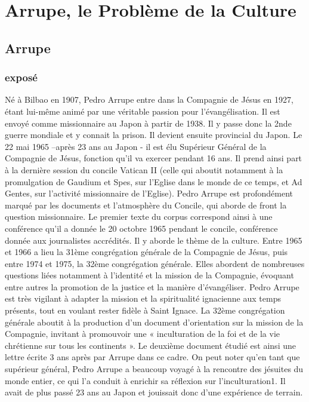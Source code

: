 \chapter{Arrupe, le Problème de la Culture}


\section{Arrupe}

\subsection{exposé}

Né à Bilbao en 1907, Pedro Arrupe entre dans la Compagnie de Jésus en 1927, étant lui-même animé par une véritable passion pour l’évangélisation. Il est envoyé comme missionnaire au Japon à partir de 1938. Il y passe donc la 2nde guerre mondiale et y connait la prison. Il devient ensuite provincial du Japon.
Le 22 mai 1965 –après 23 ans au Japon - il est élu Supérieur Général de la Compagnie de Jésus, fonction qu’il va exercer pendant 16 ans. Il prend ainsi part à la dernière session du concile Vatican II (celle qui aboutit notamment à la promulgation de Gaudium et Spes, sur l’Eglise dans le monde de ce temps, et Ad Gentes, sur l’activité missionnaire de l’Eglise). Pedro Arrupe est profondément marqué par les documents et l’atmosphère du Concile, qui aborde de front la question missionnaire. Le premier texte du corpus correspond ainsi à une conférence qu’il a donnée le 20 octobre 1965 pendant le concile, conférence donnée aux journalistes accrédités. Il y aborde le thème de la culture.
Entre 1965 et 1966 a lieu la 31ème congrégation générale de la Compagnie de Jésus, puis entre 1974 et 1975, la 32ème congrégation générale. Elles abordent de nombreuses questions liées notamment à l’identité et la mission de la Compagnie, évoquant entre autres la promotion de la justice et la manière d’évangéliser. Pedro Arrupe est très vigilant à adapter la mission et la spiritualité ignacienne aux temps présents, tout en voulant rester fidèle à Saint Ignace. La 32ème congrégation générale aboutit à la production d’un document d’orientation sur la mission de la Compagnie, invitant à promouvoir une « inculturation de la foi et de la vie chrétienne sur tous les continents ». Le deuxième document étudié est ainsi une lettre écrite 3 ans après par Arrupe dans ce cadre.
On peut noter qu’en tant que supérieur général, Pedro Arrupe a beaucoup voyagé à la rencontre des jésuites du monde entier, ce qui l’a conduit à enrichir sa réflexion sur l’inculturation1. Il avait de plus passé 23 ans au Japon et jouissait donc d’une expérience de terrain.
